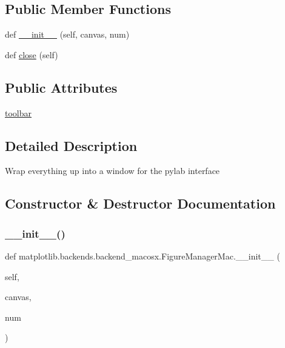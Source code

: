 \subsection*{Public Member Functions}
\begin{DoxyCompactItemize}
\item 
def \hyperlink{classmatplotlib_1_1backends_1_1backend__macosx_1_1FigureManagerMac_a9a1c98b655e29ce94784fae1a4257cf0}{\+\_\+\+\_\+init\+\_\+\+\_\+} (self, canvas, num)
\item 
def \hyperlink{classmatplotlib_1_1backends_1_1backend__macosx_1_1FigureManagerMac_ac8bead85ea3576b299d6c11c45211530}{close} (self)
\end{DoxyCompactItemize}
\subsection*{Public Attributes}
\begin{DoxyCompactItemize}
\item 
\hyperlink{classmatplotlib_1_1backends_1_1backend__macosx_1_1FigureManagerMac_a1f536c2bd1fafc7b133feed09f9306e1}{toolbar}
\end{DoxyCompactItemize}


\subsection{Detailed Description}
\begin{DoxyVerb}Wrap everything up into a window for the pylab interface
\end{DoxyVerb}
 

\subsection{Constructor \& Destructor Documentation}
\mbox{\label{classmatplotlib_1_1backends_1_1backend__macosx_1_1FigureManagerMac_a9a1c98b655e29ce94784fae1a4257cf0}} 
\subsubsection{\texorpdfstring{\+\_\+\+\_\+init\+\_\+\+\_\+()}{\_\_init\_\_()}}
{\footnotesize\ttfamily def matplotlib.\+backends.\+backend\+\_\+macosx.\+Figure\+Manager\+Mac.\+\_\+\+\_\+init\+\_\+\+\_\+ (\begin{DoxyParamCaption}\item[{}]{self,  }\item[{}]{canvas,  }\item[{}]{num }\end{DoxyParamCaption})}



